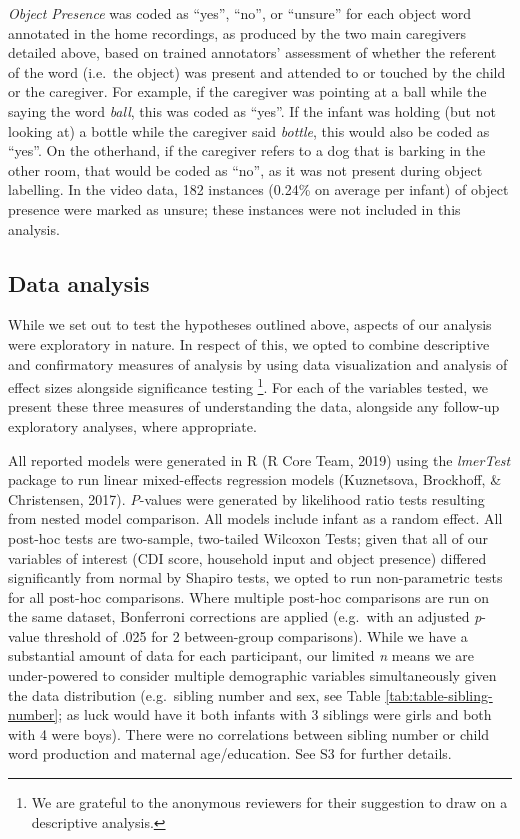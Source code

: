 \documentclass[
  man,mask,floatsintext]{apa6}
\begin{document}
\emph{Object Presence} was coded as ``yes'', ``no'', or ``unsure'' for each object word annotated in the home recordings, as produced by the two main caregivers detailed above, based on trained annotators' assessment of whether the referent of the word (i.e.~the object) was present and attended to or touched by the child or the caregiver. For example, if the caregiver was pointing at a ball while the saying the word \emph{ball}, this was coded as ``yes''. If the infant was holding (but not looking at) a bottle while the caregiver said \emph{bottle}, this would also be coded as ``yes''. On the otherhand, if the caregiver refers to a dog that is barking in the other room, that would be coded as ``no'', as it was not present during object labelling. In the video data, 182 instances (0.24\% on average per infant) of object presence were marked as unsure; these instances were not included in this analysis.

\hypertarget{data-analysis}{%
\subsection{Data analysis}\label{data-analysis}}

While we set out to test the hypotheses outlined above, aspects of our analysis were exploratory in nature. In respect of this, we opted to combine descriptive and confirmatory measures of analysis by using data visualization and analysis of effect sizes alongside significance testing \footnote{We are grateful to the anonymous reviewers for their suggestion to draw on a descriptive analysis.}. For each of the variables tested, we present these three measures of understanding the data, alongside any follow-up exploratory analyses, where appropriate.

All reported models were generated in R (R Core Team, 2019) using the \emph{lmerTest} package to run linear mixed-effects regression models (Kuznetsova, Brockhoff, \& Christensen, 2017). \emph{P}-values were generated by likelihood ratio tests resulting from nested model comparison. All models include infant as a random effect. All post-hoc tests are two-sample, two-tailed Wilcoxon Tests; given that all of our variables of interest (CDI score, household input and object presence) differed significantly from normal by Shapiro tests, we opted to run non-parametric tests for all post-hoc comparisons. Where multiple post-hoc comparisons are run on the same dataset, Bonferroni corrections are applied (e.g.~with an adjusted \emph{p}-value threshold of .025 for 2 between-group comparisons). While we have a substantial amount of data for each participant, our limited \emph{n} means we are under-powered to consider multiple demographic variables simultaneously given the data distribution (e.g.~sibling number and sex, see Table \ref{tab:table-sibling-number}; as luck would have it both infants with 3 siblings were girls and both with 4 were boys). There were no correlations between sibling number or child word production and maternal age/education. See S3 for further details.
\end{document}
